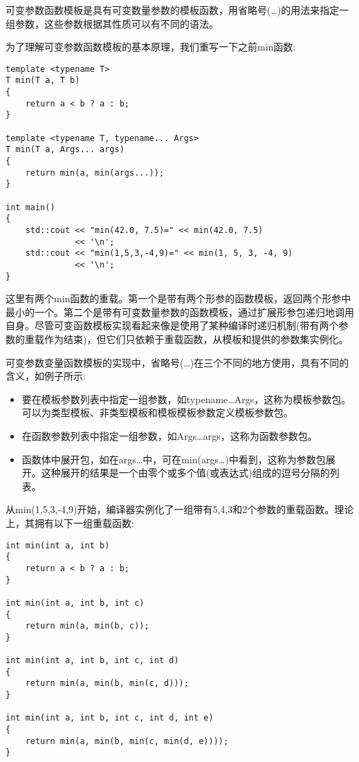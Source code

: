 可变参数函数模板是具有可变数量参数的模板函数，用省略号(…)的用法来指定一组参数，这些参数根据其性质可以有不同的语法。

为了理解可变参数函数模板的基本原理，我们重写一下之前min函数:

\begin{lstlisting}[style=styleCXX]
template <typename T>
T min(T a, T b)
{
	return a < b ? a : b;
}

template <typename T, typename... Args>
T min(T a, Args... args)
{
	return min(a, min(args...));
}

int main()
{
	std::cout << "min(42.0, 7.5)=" << min(42.0, 7.5)
	          << '\n';
	std::cout << "min(1,5,3,-4,9)=" << min(1, 5, 3, -4, 9)
	          << '\n';
}
\end{lstlisting}

这里有两个min函数的重载。第一个是带有两个形参的函数模板，返回两个形参中最小的一个。第二个是带有可变数量参数的函数模板，通过扩展形参包递归地调用自身。尽管可变函数模板实现看起来像是使用了某种编译时递归机制(带有两个参数的重载作为结束)，但它们只依赖于重载函数，从模板和提供的参数集实例化。

可变参数变量函数模板的实现中，省略号(…)在三个不同的地方使用，具有不同的含义，如例子所示:

\begin{itemize}
\item
要在模板参数列表中指定一组参数，如typename…Args，这称为模板参数包。可以为类型模板、非类型模板和模板模板参数定义模板参数包。

\item
在函数参数列表中指定一组参数，如Args…args，这称为函数参数包。

\item
函数体中展开包，如在args…中，可在min(args…)中看到，这称为参数包展开。这种展开的结果是一个由零个或多个值(或表达式)组成的逗号分隔的列表。
\end{itemize}

从min(1,5,3,-4,9)开始，编译器实例化了一组带有5,4,3和2个参数的重载函数。理论上，其拥有以下一组重载函数:

\begin{lstlisting}[style=styleCXX]
int min(int a, int b)
{
	return a < b ? a : b;
}

int min(int a, int b, int c)
{
	return min(a, min(b, c));
}

int min(int a, int b, int c, int d)
{
	return min(a, min(b, min(c, d)));
}

int min(int a, int b, int c, int d, int e)
{
	return min(a, min(b, min(c, min(d, e))));
}
\end{lstlisting}

